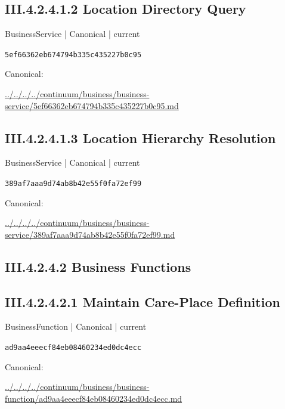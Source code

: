 \documentclass[10pt,a4paper]{article}
\begin{document}
\subsection*{III.4.2.4.1.2 Location Directory Query}
\label{element-5ef66362eb674794b335c435227b0c95}
{\small BusinessService | Canonical | current}\par
\texttt{5ef66362eb674794b335c435227b0c95}\par
Canonical: \par
{\footnotesize\url{../../../../continuum/business/business-service/5ef66362eb674794b335c435227b0c95.md}}\par
\subsection*{III.4.2.4.1.3 Location Hierarchy Resolution}
\label{element-389af7aaa9d74ab8b42e55f0fa72ef99}
{\small BusinessService | Canonical | current}\par
\texttt{389af7aaa9d74ab8b42e55f0fa72ef99}\par
Canonical: \par
{\footnotesize\url{../../../../continuum/business/business-service/389af7aaa9d74ab8b42e55f0fa72ef99.md}}\par
\subsection*{III.4.2.4.2 Business Functions}
\subsection*{III.4.2.4.2.1 Maintain Care-Place Definition}
\label{element-ad9aa4eeecf84eb08460234ed0dc4ecc}
{\small BusinessFunction | Canonical | current}\par
\texttt{ad9aa4eeecf84eb08460234ed0dc4ecc}\par
Canonical: \par
{\footnotesize\url{../../../../continuum/business/business-function/ad9aa4eeecf84eb08460234ed0dc4ecc.md}}\par
\end{document}
